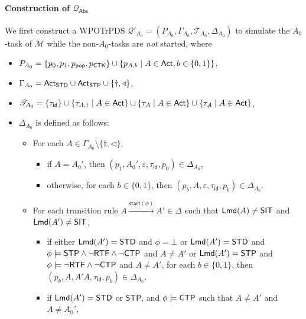 \documentclass[preprint,12pt]{elsarticle}
\newcommand\Mm{{\mathcal{M} }}
\newcommand\Qq{{\mathcal{Q} }}
\newcommand\act{{\sf Act}}
\newcommand\lmd{{\sf Lmd}}
\newcommand\ctpflag{{\sf CTP}}
\newcommand\stpflag{{\sf STP}}
\newcommand\ctkflag{{\sf CTK}}
\newcommand\rtfflag{{\sf RTF}}
\newcommand\startactivity{{\mathsf{start} }}
\newcommand\abs{{\mathsf{Abs} }}
\newcommand{\STK}{\mathsf{STK}}
\newcommand{\SIT}{\mathsf{SIT}}
\newcommand{\STD}{\mathsf{STD}}
\newcommand{\STP}{\mathsf{STP}}
\newcommand{\id}{\mathsf{id}}
\newcommand\TranSet{{\mathscr{T} }}
\newcommand{\WOTrPDS}{\textsf{WPOTrPDS}}
\newcommand\pop{\mathsf{pop}}
\begin{document}
{\paragraph{Construction of $\Qq_{\abs}$} 
We first construct a {\WOTrPDS} $\Qq'_{A_0} = (P_{A_0},\Gamma_{A_0},\TranSet_{A_0},\Delta_{A_0})$ to simulate the $A_0$-task of $\Mm$ while the non-$A_0$-tasks are \emph{not} started, where
\begin{itemize}
    \item $P_{A_0} = \{p_0,p_1, p_{\pop}, p_{\ctkflag}\}\cup\{p_{A,b}\mid A\in\act, b\in\{0,1\}\}$,
    \item $\Gamma_{A_0} = \act_\STD \cup \act_\STP \cup \{\dag,\triangleleft\}$, 
    \item $\TranSet_{A_0} = \{\tau_{\id} \}\cup \{\tau_{A, \dag} \mid A \in \act\} \cup \{\tau_{A} \mid A \in \act\}  \cup \{\tau_{\not A} \mid A \in \act\}$,
    \item $\Delta_{A_0}$ is defined as follows:
            \begin{itemize}
                \item For each $A \in \Gamma_{A_0}\setminus\{\dag,\triangleleft\}$, 
                \begin{itemize}
                    \item if $A = A_0'$, then $(p_1,A_0',\varepsilon,\tau_{\id},p_0)\in\Delta_{A_0}$,
                    \item otherwise, for each $b\in\{0,1\}$, then $(p_b,A,\varepsilon,\tau_{\id},p_b)\in\Delta_{A_0}$.
                \end{itemize}
                \item For each transition rule $A\xrightarrow{\startactivity(\phi)}A'\in\Delta$ such that $\lmd(A)\neq\SIT$ and $\lmd(A')\neq\SIT$,
                \begin{itemize}
                    \item if either $\lmd(A') = \STD$ and $\phi = \bot$ or $\lmd(A') = \STD$ and $\phi\models\stpflag\wedge\neg\rtfflag\wedge\neg\ctpflag$ and $A\neq A'$ or $\lmd(A') = \STP$ and $\phi\models\neg\rtfflag\wedge\neg\ctpflag$ and $A\neq A'$, 
                    for each $b\in\{0,1\}$, then $(p_b, A, A'A, \tau_{\id}, p_b) \in \Delta_{A_0}$, 
                    \item if $\lmd(A') = \STD$ or $\STP$, and $\phi\models \ctpflag$ such that $A\neq A'$ and $A\neq A_0'$,

\end{itemize}
\end{itemize}
\end{itemize}}
\end{document}
